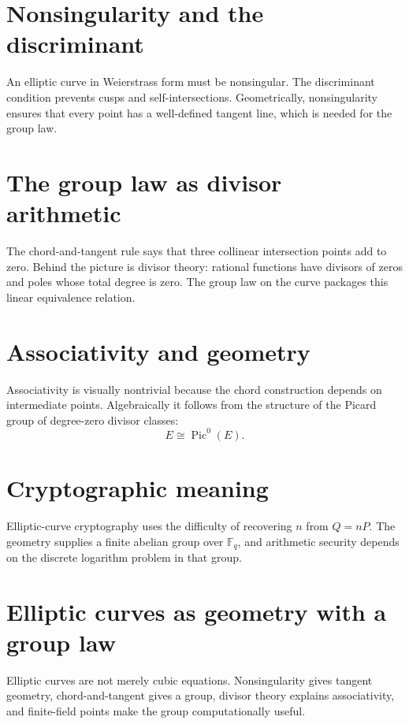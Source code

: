 \section{Nonsingularity and the discriminant}
An elliptic curve in Weierstrass form must be nonsingular.  The discriminant condition prevents cusps and self-intersections.  Geometrically, nonsingularity ensures that every point has a well-defined tangent line, which is needed for the group law.
\section{The group law as divisor arithmetic}
The chord-and-tangent rule says that three collinear intersection points add to zero.  Behind the picture is divisor theory: rational functions have divisors of zeros and poles whose total degree is zero.  The group law on the curve packages this linear equivalence relation.
\section{Associativity and geometry}
Associativity is visually nontrivial because the chord construction depends on intermediate points.  Algebraically it follows from the structure of the Picard group of degree-zero divisor classes:
\[
E\cong \operatorname{Pic}^0(E).
\]
\section{Cryptographic meaning}
Elliptic-curve cryptography uses the difficulty of recovering \(n\) from \(Q=nP\).  The geometry supplies a finite abelian group over \(\mathbb F_q\), and arithmetic security depends on the discrete logarithm problem in that group.
\section{Elliptic curves as geometry with a group law}
Elliptic curves are not merely cubic equations.  Nonsingularity gives tangent geometry, chord-and-tangent gives a group, divisor theory explains associativity, and finite-field points make the group computationally useful.
